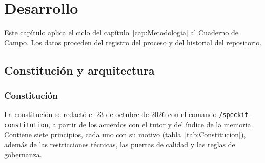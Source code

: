 \chapter{Desarrollo}\label{cap:Desarrollo}

Este capítulo aplica el ciclo del capítulo~\ref{cap:Metodologia} al Cuaderno de Campo. Los datos proceden del registro del proceso y del historial del repositorio. 

\section{Constitución y arquitectura}\label{sec:Constitucion}

\subsection{Constitución}\label{subsec:ConstitucionProyecto}

La constitución se redactó el 23 de octubre de 2026 con el comando \texttt{/speckit-constitution}, a partir de los acuerdos con el tutor y del índice de la memoria. Contiene siete principios, cada uno con su motivo (tabla~\ref{tab:Constitucion}), además de las restricciones técnicas, las puertas de calidad y las reglas de gobernanza.

